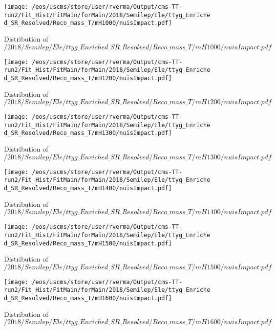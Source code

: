 \begin{figure}
\centering
\texttt{[image: /eos/uscms/store/user/rverma/Output/cms-TT-run2/Fit\_Hist/FitMain/forMain/2018/Semilep/Ele/ttyg\_Enriched\_SR\_Resolved/Reco\_mass\_T/mH1000/nuisImpact.pdf]}
\caption{Distribution of $/2018/Semilep/Ele/ttyg\_Enriched\_SR\_Resolved/Reco\_mass\_T/mH1000/nuisImpact.pdf$}
\end{figure}

\begin{figure}
\centering
\texttt{[image: /eos/uscms/store/user/rverma/Output/cms-TT-run2/Fit\_Hist/FitMain/forMain/2018/Semilep/Ele/ttyg\_Enriched\_SR\_Resolved/Reco\_mass\_T/mH1200/nuisImpact.pdf]}
\caption{Distribution of $/2018/Semilep/Ele/ttyg\_Enriched\_SR\_Resolved/Reco\_mass\_T/mH1200/nuisImpact.pdf$}
\end{figure}

\begin{figure}
\centering
\texttt{[image: /eos/uscms/store/user/rverma/Output/cms-TT-run2/Fit\_Hist/FitMain/forMain/2018/Semilep/Ele/ttyg\_Enriched\_SR\_Resolved/Reco\_mass\_T/mH1300/nuisImpact.pdf]}
\caption{Distribution of $/2018/Semilep/Ele/ttyg\_Enriched\_SR\_Resolved/Reco\_mass\_T/mH1300/nuisImpact.pdf$}
\end{figure}

\begin{figure}
\centering
\texttt{[image: /eos/uscms/store/user/rverma/Output/cms-TT-run2/Fit\_Hist/FitMain/forMain/2018/Semilep/Ele/ttyg\_Enriched\_SR\_Resolved/Reco\_mass\_T/mH1400/nuisImpact.pdf]}
\caption{Distribution of $/2018/Semilep/Ele/ttyg\_Enriched\_SR\_Resolved/Reco\_mass\_T/mH1400/nuisImpact.pdf$}
\end{figure}

\begin{figure}
\centering
\texttt{[image: /eos/uscms/store/user/rverma/Output/cms-TT-run2/Fit\_Hist/FitMain/forMain/2018/Semilep/Ele/ttyg\_Enriched\_SR\_Resolved/Reco\_mass\_T/mH1500/nuisImpact.pdf]}
\caption{Distribution of $/2018/Semilep/Ele/ttyg\_Enriched\_SR\_Resolved/Reco\_mass\_T/mH1500/nuisImpact.pdf$}
\end{figure}

\begin{figure}
\centering
\texttt{[image: /eos/uscms/store/user/rverma/Output/cms-TT-run2/Fit\_Hist/FitMain/forMain/2018/Semilep/Ele/ttyg\_Enriched\_SR\_Resolved/Reco\_mass\_T/mH1600/nuisImpact.pdf]}
\caption{Distribution of $/2018/Semilep/Ele/ttyg\_Enriched\_SR\_Resolved/Reco\_mass\_T/mH1600/nuisImpact.pdf$}
\end{figure}

